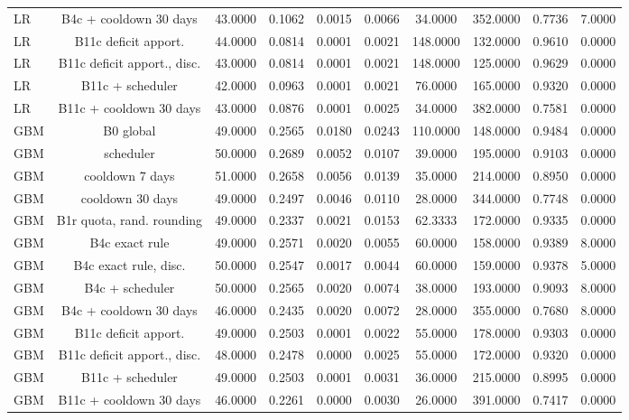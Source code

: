 \documentclass[10pt,onecolumn,letterpaper]{article}
\begin{document}
\begin{table}[!t]
{\begin{tabular}{lccccccccc}
LR & B4c + cooldown 30 days & 43.0000 & 0.1062 & 0.0015 & 0.0066 & 34.0000 & 352.0000 & 0.7736 & 7.0000 \\
LR & B11c deficit apport. & 44.0000 & 0.0814 & 0.0001 & 0.0021 & 148.0000 & 132.0000 & 0.9610 & 0.0000 \\
LR & B11c deficit apport., disc. & 43.0000 & 0.0814 & 0.0001 & 0.0021 & 148.0000 & 125.0000 & 0.9629 & 0.0000 \\
LR & B11c + scheduler & 42.0000 & 0.0963 & 0.0001 & 0.0021 & 76.0000 & 165.0000 & 0.9320 & 0.0000 \\
LR & B11c + cooldown 30 days & 43.0000 & 0.0876 & 0.0001 & 0.0025 & 34.0000 & 382.0000 & 0.7581 & 0.0000 \\
GBM & B0 global & 49.0000 & 0.2565 & 0.0180 & 0.0243 & 110.0000 & 148.0000 & 0.9484 & 0.0000 \\
GBM & scheduler & 50.0000 & 0.2689 & 0.0052 & 0.0107 & 39.0000 & 195.0000 & 0.9103 & 0.0000 \\
GBM & cooldown 7 days & 51.0000 & 0.2658 & 0.0056 & 0.0139 & 35.0000 & 214.0000 & 0.8950 & 0.0000 \\
GBM & cooldown 30 days & 49.0000 & 0.2497 & 0.0046 & 0.0110 & 28.0000 & 344.0000 & 0.7748 & 0.0000 \\
GBM & B1r quota, rand. rounding & 49.0000 & 0.2337 & 0.0021 & 0.0153 & 62.3333 & 172.0000 & 0.9335 & 0.0000 \\
GBM & B4c exact rule & 49.0000 & 0.2571 & 0.0020 & 0.0055 & 60.0000 & 158.0000 & 0.9389 & 8.0000 \\
GBM & B4c exact rule, disc. & 50.0000 & 0.2547 & 0.0017 & 0.0044 & 60.0000 & 159.0000 & 0.9378 & 5.0000 \\
GBM & B4c + scheduler & 50.0000 & 0.2565 & 0.0020 & 0.0074 & 38.0000 & 193.0000 & 0.9093 & 8.0000 \\
GBM & B4c + cooldown 30 days & 46.0000 & 0.2435 & 0.0020 & 0.0072 & 28.0000 & 355.0000 & 0.7680 & 8.0000 \\
GBM & B11c deficit apport. & 49.0000 & 0.2503 & 0.0001 & 0.0022 & 55.0000 & 178.0000 & 0.9303 & 0.0000 \\
GBM & B11c deficit apport., disc. & 48.0000 & 0.2478 & 0.0000 & 0.0025 & 55.0000 & 172.0000 & 0.9320 & 0.0000 \\
GBM & B11c + scheduler & 49.0000 & 0.2503 & 0.0001 & 0.0031 & 36.0000 & 215.0000 & 0.8995 & 0.0000 \\
GBM & B11c + cooldown 30 days & 46.0000 & 0.2261 & 0.0000 & 0.0030 & 26.0000 & 391.0000 & 0.7417 & 0.0000 \\

\end{tabular}}
\end{table}
\end{document}
